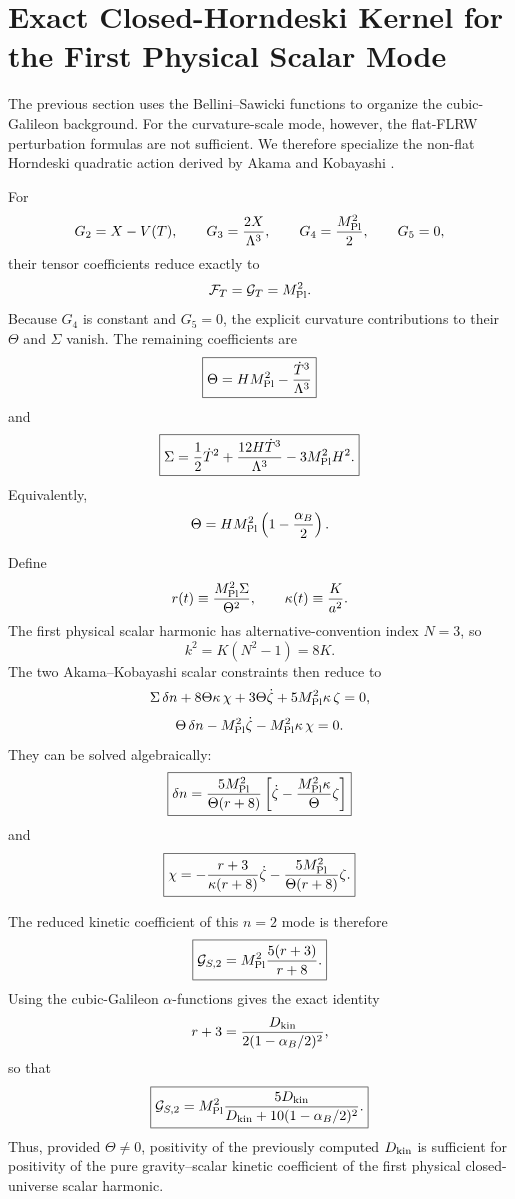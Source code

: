 \section{Exact Closed-Horndeski Kernel for the First Physical Scalar Mode}
\label{sec:closed-horndeski-n2}

The previous section uses the Bellini--Sawicki functions to organize the cubic-Galileon background. For the curvature-scale mode, however, the flat-FLRW perturbation formulas are not sufficient. We therefore specialize the non-flat Horndeski quadratic action derived by Akama and Kobayashi \citep{AkamaKobayashi2019}.

For
\[
G_2=X-V(T),\qquad
G_3=\frac{2X}{\Lambda^3},\qquad
G_4=\frac{M_{\rm Pl}^2}{2},\qquad
G_5=0,
\]
their tensor coefficients reduce exactly to
\[
\mathcal F_T=\mathcal G_T=M_{\rm Pl}^2.
\]
Because \(G_4\) is constant and \(G_5=0\), the explicit curvature contributions to their \(\Theta\) and \(\Sigma\) vanish. The remaining coefficients are
\[
\boxed{
\Theta
=
HM_{\rm Pl}^2-\frac{\dot T^3}{\Lambda^3}
}
\]
and
\[
\boxed{
\Sigma
=
\frac12\dot T^2
+\frac{12H\dot T^3}{\Lambda^3}
-3M_{\rm Pl}^2H^2.
}
\]
Equivalently,
\[
\Theta
=
HM_{\rm Pl}^2
\left(1-\frac{\alpha_B}{2}\right).
\]

Define
\[
r(t)
\equiv
\frac{M_{\rm Pl}^2\Sigma}{\Theta^2},
\qquad
\kappa(t)\equiv\frac{K}{a^2}.
\]
The first physical scalar harmonic has alternative-convention index \(N=3\), so
\[
k^2=K(N^2-1)=8K.
\]
The two Akama--Kobayashi scalar constraints then reduce to
\[
\Sigma\,\delta n
+8\Theta\kappa\,\chi
+3\Theta\dot\zeta
+5M_{\rm Pl}^2\kappa\,\zeta=0,
\]
\[
\Theta\,\delta n
-M_{\rm Pl}^2\dot\zeta
-M_{\rm Pl}^2\kappa\,\chi=0.
\]
They can be solved algebraically:
\[
\boxed{
\delta n
=
\frac{5M_{\rm Pl}^2}{\Theta(r+8)}
\left[
\dot\zeta
-\frac{M_{\rm Pl}^2\kappa}{\Theta}\zeta
\right]
}
\]
and
\[
\boxed{
\chi
=
-\frac{r+3}{\kappa(r+8)}\dot\zeta
-\frac{5M_{\rm Pl}^2}{\Theta(r+8)}\zeta.
}
\]

The reduced kinetic coefficient of this \(n=2\) mode is therefore
\[
\boxed{
\mathcal G_{S,2}
=
M_{\rm Pl}^2
\frac{5(r+3)}{r+8}.
}
\]
Using the cubic-Galileon \(\alpha\)-functions gives the exact identity
\[
r+3
=
\frac{D_{\rm kin}}
{2(1-\alpha_B/2)^2},
\]
so that
\[
\boxed{
\mathcal G_{S,2}
=
M_{\rm Pl}^2
\frac{5D_{\rm kin}}
{D_{\rm kin}
+10(1-\alpha_B/2)^2}.
}
\]
Thus, provided \(\Theta\neq0\), positivity of the previously computed \(D_{\rm kin}\) is sufficient for positivity of the pure gravity--scalar kinetic coefficient of the first physical closed-universe scalar harmonic.

